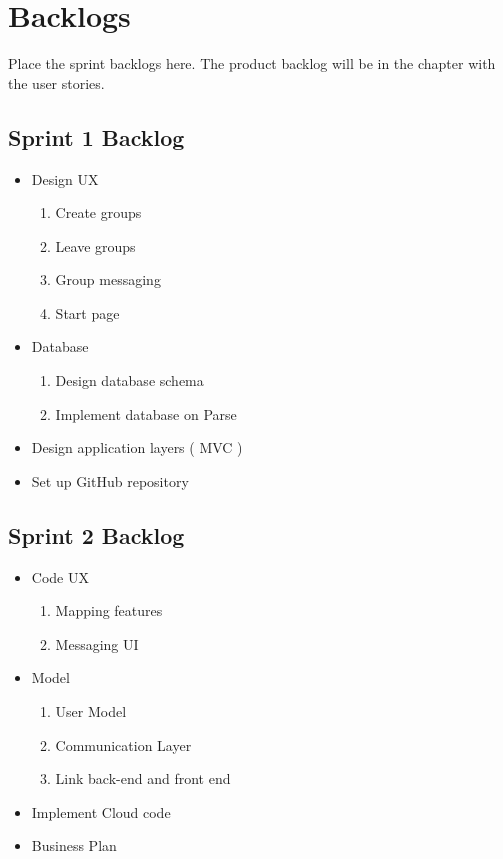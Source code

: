 \section{Backlogs}
Place the sprint backlogs here.    The product backlog will be in the chapter with the user 
stories.
\subsection{Sprint 1 Backlog}
	\begin{itemize}
	\item Design UX
		\begin{enumerate}
		\item Create groups
		\item Leave groups
		\item Group messaging
		\item Start page
		\end{enumerate}
	\item Database
		\begin{enumerate}
		\item Design database schema
		\item Implement database on Parse
		\end{enumerate}
	\item Design application layers ( MVC )
	\item Set up GitHub repository
	\end{itemize}
	
\subsection{Sprint 2 Backlog}

	\begin{itemize}
	\item Code UX
		\begin{enumerate}
		\item Mapping features
		\item Messaging UI
		\end{enumerate}
	\item Model
		\begin{enumerate}
		\item User Model
		\item Communication Layer
		\item Link back-end and front end
		\end{enumerate}
	\item Implement Cloud code
	\item Business Plan

	\end{itemize}
